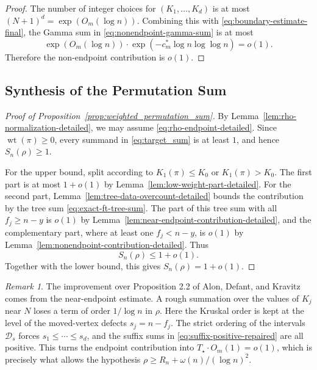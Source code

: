 \documentclass[11pt,reqno]{amsart}
\theoremstyle{definition}
\theoremstyle{remark}
\newtheorem{remark}[theorem]{Remark}
\renewcommand\le{\leqslant}
\renewcommand\ge{\geqslant}
\newcommand{\wt}{\operatorname{wt}}
\begin{document}
\begin{proof}
The number of integer choices for $(K_1,\ldots,K_d)$ is at most $(N+1)^d=\exp(O_m(\log n))$. Combining this with \eqref{eq:boundary-estimate-final}, the Gamma sum in \eqref{eq:nonendpoint-gamma-sum} is at most
\[
\exp(O_m(\log n))\cdot \exp(-c_m^\ast\log n\log\log n)=o(1).
\]
Therefore the non-endpoint contribution is $o(1)$.
\end{proof}


\subsection{Synthesis of the Permutation Sum}\label{subsec:synthesis}

\begin{proof}[Proof of Proposition~\ref{prop:weighted_permutation_sum}]
By Lemma~\ref{lem:rho-normalization-detailed}, we may assume \eqref{eq:rho-endpoint-detailed}. Since $\wt(\pi)\ge0$, every summand in \eqref{eq:target_sum} is at least $1$, and hence $S_n(\rho)\ge1$.

For the upper bound, split according to $K_1(\pi)\le K_0$ or $K_1(\pi)>K_0$. The first part is at most $1+o(1)$ by Lemma~\ref{lem:low-weight-part-detailed}. For the second part, Lemma~\ref{lem:tree-data-overcount-detailed} bounds the contribution by the tree sum \eqref{eq:exact-ft-tree-sum}. The part of this tree sum with all $f_j\ge n-y$ is $o(1)$ by Lemma~\ref{lem:near-endpoint-contribution-detailed}, and the complementary part, where at least one $f_j<n-y$, is $o(1)$ by Lemma~\ref{lem:nonendpoint-contribution-detailed}. Thus
\[
        S_n(\rho)\le 1+o(1).
\]
Together with the lower bound, this gives $S_n(\rho)=1+o(1)$.
\end{proof}


\begin{remark}\label{remark:final}
The improvement over Proposition 2.2 of Alon, Defant, and Kravitz~\cite{ADK} comes from the near-endpoint estimate. A rough summation over the values of \(K_j\) near \(N\) loses a term of order \(1/\log n\) in \(\rho\). Here the Kruskal order is kept at the level of the moved-vertex defects \(s_j=n-f_j\). The strict ordering of the intervals \(\mathcal D_s\) forces \(s_1\le\cdots\le s_d\), and the suffix sums in \eqref{eq:suffix-positive-repaired} are all positive. This turns the endpoint contribution into \(T_\star\cdot O_m(1)=o(1)\), which is precisely what allows the hypothesis \(\rho\ge R_n+\omega(n)/(\log n)^2\).
\end{remark}

\medskip
\end{document}
